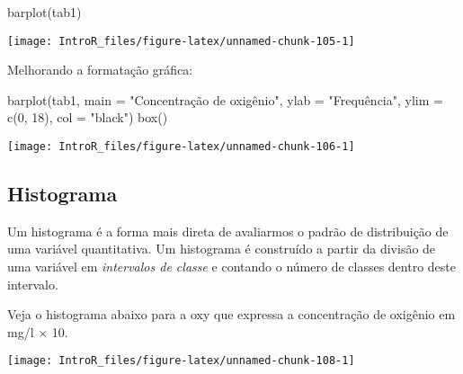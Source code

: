 \documentclass[
]{book}
\newenvironment{Shaded}{\begin{snugshade}}{\end{snugshade}}
\newcommand{\AttributeTok}[1]{\textcolor[rgb]{0.77,0.63,0.00}{#1}}
\newcommand{\DecValTok}[1]{\textcolor[rgb]{0.00,0.00,0.81}{#1}}
\newcommand{\FunctionTok}[1]{\textcolor[rgb]{0.00,0.00,0.00}{#1}}
\newcommand{\NormalTok}[1]{#1}
\newcommand{\SpecialCharTok}[1]{\textcolor[rgb]{0.00,0.00,0.00}{#1}}
\newcommand{\StringTok}[1]{\textcolor[rgb]{0.31,0.60,0.02}{#1}}
\begin{document}
\begin{Shaded}
\begin{Highlighting}[]
\FunctionTok{barplot}\NormalTok{(tab1)}
\end{Highlighting}
\end{Shaded}

\begin{center}\texttt{[image: IntroR\_files/figure-latex/unnamed-chunk-105-1]} \end{center}

Melhorando a formatação gráfica:

\begin{Shaded}
\begin{Highlighting}[]
\FunctionTok{barplot}\NormalTok{(tab1,}
        \AttributeTok{main =} \StringTok{"Concentração de oxigênio"}\NormalTok{,}
        \AttributeTok{ylab =} \StringTok{"Frequência"}\NormalTok{,}
        \AttributeTok{ylim =} \FunctionTok{c}\NormalTok{(}\DecValTok{0}\NormalTok{, }\DecValTok{18}\NormalTok{), }\AttributeTok{col =} \StringTok{"black"}\NormalTok{)}
\FunctionTok{box}\NormalTok{()}
\end{Highlighting}
\end{Shaded}

\begin{center}\texttt{[image: IntroR\_files/figure-latex/unnamed-chunk-106-1]} \end{center}

\hypertarget{histograma}{%
\subsection{Histograma}\label{histograma}}

Um histograma é a forma mais direta de avaliarmos o padrão de distribuição de uma variável quantitativa. Um histograma é construído a partir da divisão de uma variável em \emph{intervalos de classe} e contando o número de classes dentro deste intervalo.

Veja o histograma abaixo para a oxy que expressa a concentração de oxigênio em mg/l \(\times\) 10.

\begin{Shaded}
\end{Shaded}

\begin{center}\texttt{[image: IntroR\_files/figure-latex/unnamed-chunk-108-1]} \end{center}
\end{document}
